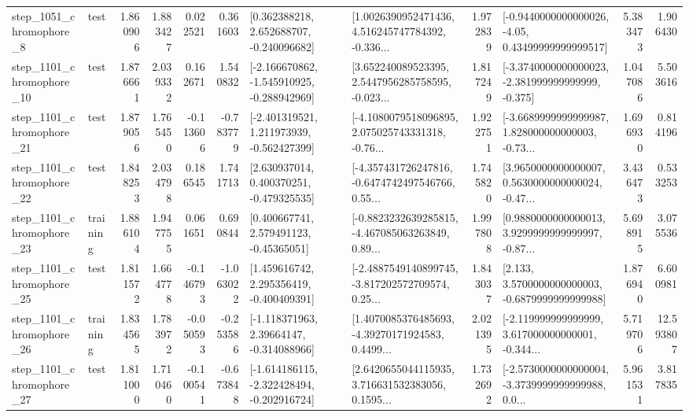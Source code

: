 \begin{tabular}{llrrrrllrlrr}
  step\_1051\_chromophore\_8 &      test &      1.860906 &    1.883427 &      0.022521 &  0.361603 &    [0.362388218, 2.652688707, -0.240096682] &  [1.0026390952471436, 4.516245747784392, -0.336... &       1.972839 &  [-0.9440000000000026, -4.05, 0.43499999999999517] &            5.383473 &          1.906430 \\
 step\_1101\_chromophore\_10 &      test &      1.876661 &    2.039332 &      0.162671 &  1.540832 &  [-2.166670862, -1.545910925, -0.288942969] &  [3.652240089523395, 2.5447956285758595, -0.023... &       1.817249 &  [-3.3740000000000023, -2.381999999999999, -0.375] &            1.047086 &          5.503616 \\
 step\_1101\_chromophore\_21 &      test &      1.879056 &    1.765450 &     -0.113606 & -0.783779 &   [-2.401319521, 1.211973939, -0.562427399] &  [-4.1080079518096895, 2.075025743331318, -0.76... &       1.922751 &  [-3.6689999999999987, 1.828000000000003, -0.73... &            1.696930 &          0.814196 \\
 step\_1101\_chromophore\_22 &      test &      1.848253 &    2.034798 &      0.186545 &  1.741713 &    [2.630937014, 0.400370251, -0.479325535] &  [-4.357431726247816, -0.6474742497546766, 0.55... &       1.745820 &  [3.9650000000000007, 0.5630000000000024, -0.47... &            3.436473 &          0.533253 \\
 step\_1101\_chromophore\_23 &  training &      1.886104 &    1.947755 &      0.061651 &  0.690844 &     [0.400667741, 2.579491123, -0.45365051] &  [-0.8823232639285815, -4.467085063263849, 0.89... &       1.997808 &  [0.9880000000000013, 3.9299999999999997, -0.87... &            5.698915 &          3.075536 \\
 step\_1101\_chromophore\_25 &      test &      1.811572 &    1.664778 &     -0.146793 & -1.063022 &    [1.459616742, 2.295356419, -0.400409391] &  [-2.4887549140899745, -3.817202572709574, 0.25... &       1.843037 &   [2.133, 3.5700000000000003, -0.6879999999999988] &            1.876940 &          6.600981 \\
 step\_1101\_chromophore\_26 &  training &      1.834565 &    1.783972 &     -0.050593 & -0.253586 &    [-1.118371963, 2.39664147, -0.314088966] &  [1.4070085376485693, -4.39270171924583, 0.4499... &       2.021395 &  [-2.119999999999999, 3.617000000000001, -0.344... &            5.719706 &         12.593807 \\
 step\_1101\_chromophore\_27 &      test &      1.811000 &    1.710460 &     -0.100541 & -0.673848 &  [-1.614186115, -2.322428494, -0.202916724] &  [2.6420655044115935, 3.716631532383056, 0.1595... &       1.732692 &  [-2.5730000000000004, -3.3739999999999988, 0.0... &            5.961531 &          3.817835 \\

\end{tabular}
